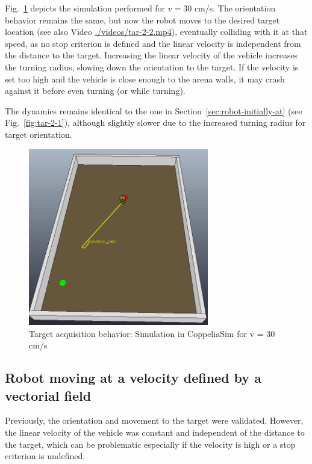 Fig.~\ref{fig:tar-2-2-arena} depicts the simulation performed for $v = 30$
cm/s. The orientation behavior remains the same, but now the robot moves to the
desired target location (see also Video
\href{run:./videos/tar-2-2.mp4}{./videos/tar-2-2.mp4}), eventually colliding
with it at that speed, as no stop criterion is defined and the linear velocity
is independent from the distance to the target.
Increasing the linear
velocity of the vehicle increases the turning radius, slowing down the
orientation to the target. If the velocity is set too high and the vehicle is
close enough to the arena walls, it may crash against it before even turning (or
while turning).

The dynamics remains identical to the one in
Section~\ref{sec:robot-initially-at} (see Fig.~\ref{fig:tar-2-1}), although
slightly slower due to the increased turning radius for target orientation.
%
%
\begin{figure}[!hbt]
\centering
    \includegraphics[width=0.7\textwidth]{./img/tar-2-2-arena.png}
  \caption{Target acquisition behavior: Simulation in CoppeliaSim for v = 30 cm/s}%
\label{fig:tar-2-2-arena}
\end{figure}
%
%
\subsection{Robot moving at a velocity defined by a vectorial field}%
\label{sec:robot-moving-vect-field}
Previously, the orientation and movement to the target were validated. However,
the linear velocity of the vehicle was constant and independent of the distance
to the target, which can be problematic especially if the velocity is high or a
stop criterion is undefined.

